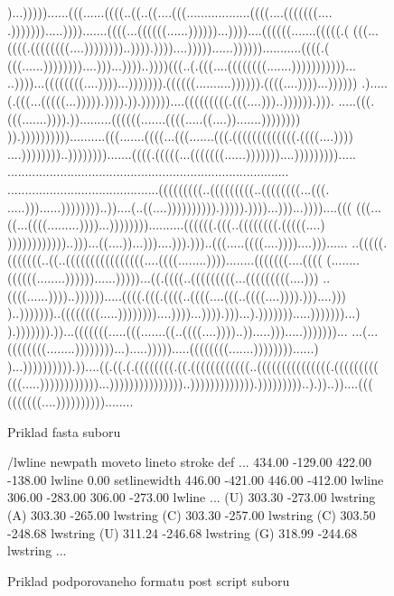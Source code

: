 \begin{figure}[H]
\begin{code}[fontsize=\scriptsize, frame=none, samepage=true]
)...)))))......(((......((((..((..((....(((..................((((....(((((((....
.))))))).....)))).......((((...((((((......))))))...))))....((((((.......(((((.(
(((...((((.((((((((....))))))))..)))).))))....)))))......))))))...........((((.(
(((......))))))))....)))...))))..))))(((..(.(((....((((((((.......)))))))))))...
..))))...((((((((....))))...))))))).((((((..........)))))).((((....))))...))))))
.).....(.(((...(((((...))))).)))).)).))))))....(((((((((.(((....)))..)))))).))).
.....(((.(((.......)))).)).........((((((.......((((.....((....)).......))))))))
)).))))))))))..........(((.......((((...(((.......(((.(((((((((((((.((((....))))
....))))))))..)))))))).......((((.(((((...(((((((......)))))))....))))))))).....
................................................................................
...........................................(((((((((..(((((((((..((((((((...(((.
.....)))......))))))))..))....(..((....)))))))))).))))).))))...)))...))))....(((
(((...((...((((.........))))...))))))))..........((((((.(((..((((((((.(((((....)
))))))))))))..)))...((....))...)))....))).)))..(((.....((((....))))....)))......
..(((((.(((((((..((..((((((((((((((((....((((........))))........(((((((....((((
(........((((((........))))))......)))))...((.((((..(((((((((...(((((((((....)))
..((((......))))..)))))).....((((.(((.((((..((((....(((..((((....)))).)))....)))
)..)))))))..((((((((.....))))))))....))))...)))).)))...).))))))).....)))))))...)
).))))))).))...(((((((.....(((.......((..((((....))))..)).....))).....)))))))...
...(...((((((((........))))))))...).....))))).....((((((((.......))))))))......)
)...)))))))))).))....((.((.(.((((((((.((.((((((((((((..(((((((((((((((.(((((((((
(((.....))))))))))))...)))))))))))))))..))))))))))))).)))))))))..).))..))....(((
(((((((....))))))))))........
\end{code}
\caption{Priklad fasta suboru}
\label{obr:mouse_fasta}
\end{figure}

\begin{figure}[H]
\begin{code}[fontsize=\scriptsize, frame=none, samepage=true]
/lwline {newpath moveto lineto stroke} def
  ...
434.00 -129.00 422.00 -138.00 lwline
0.00 setlinewidth
446.00 -421.00 446.00 -412.00 lwline
306.00 -283.00 306.00 -273.00 lwline
  ...
(U) 303.30 -273.00 lwstring
(A) 303.30 -265.00 lwstring
(C) 303.30 -257.00 lwstring
(C) 303.50 -248.68 lwstring
(U) 311.24 -246.68 lwstring
(G) 318.99 -244.68 lwstring
  ...
\end{code}
\caption{Priklad podporovaneho formatu post script suboru}
\label{obr:mouse_ps_text}
\end{figure}

